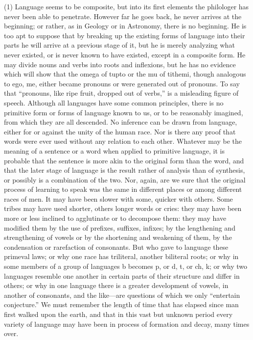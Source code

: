 \documentclass[11pt,letter]{article}
\begin{document}
\par  (1) Language seems to be composite, but into its first elements the philologer has never been able to penetrate. However far he goes back, he never arrives at the beginning; or rather, as in Geology or in Astronomy, there is no beginning. He is too apt to suppose that by breaking up the existing forms of language into their parts he will arrive at a previous stage of it, but he is merely analyzing what never existed, or is never known to have existed, except in a composite form. He may divide nouns and verbs into roots and inflexions, but he has no evidence which will show that the omega of tupto or the mu of tithemi, though analogous to ego, me, either became pronouns or were generated out of pronouns. To say that “pronouns, like ripe fruit, dropped out of verbs,” is a misleading figure of speech. Although all languages have some common principles, there is no primitive form or forms of language known to us, or to be reasonably imagined, from which they are all descended. No inference can be drawn from language, either for or against the unity of the human race. Nor is there any proof that words were ever used without any relation to each other. Whatever may be the meaning of a sentence or a word when applied to primitive language, it is probable that the sentence is more akin to the original form than the word, and that the later stage of language is the result rather of analysis than of synthesis, or possibly is a combination of the two. Nor, again, are we sure that the original process of learning to speak was the same in different places or among different races of men. It may have been slower with some, quicker with others. Some tribes may have used shorter, others longer words or cries: they may have been more or less inclined to agglutinate or to decompose them: they may have modified them by the use of prefixes, suffixes, infixes; by the lengthening and strengthening of vowels or by the shortening and weakening of them, by the condensation or rarefaction of consonants. But who gave to language these primeval laws; or why one race has triliteral, another biliteral roots; or why in some members of a group of languages b becomes p, or d, t, or ch, k; or why two languages resemble one another in certain parts of their structure and differ in others; or why in one language there is a greater development of vowels, in another of consonants, and the like—are questions of which we only “entertain conjecture.” We must remember the length of time that has elapsed since man first walked upon the earth, and that in this vast but unknown period every variety of language may have been in process of formation and decay, many times over.
\end{document}
